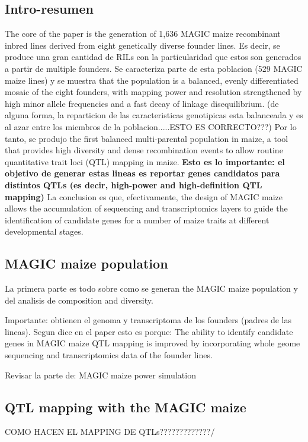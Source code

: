 \documentclass[a4paper,10pt]{article}
\begin{document}
\subsection{Intro-resumen}
The core of the paper is the generation of 1,636 MAGIC maize recombinant inbred lines derived from eight genetically diverse founder lines.
Es decir, se produce una gran cantidad de RILs con la particularidad que estos son generados a partir de multiple founders. 
Se caracteriza parte de esta poblacion (529 MAGIC maize lines) y se muestra that the population is a balanced, evenly differentiated mosaic of the eight founders, with mapping power and resolution strengthened by high minor allele frequencies and a fast decay of linkage disequilibrium.
(de alguna forma, la reparticion de las caracteristicas genotipicas esta balanceada y es al azar entre los miembros de la poblacion.....ESTO ES CORRECTO???)
Por lo tanto, se produjo the first balanced multi-parental population in maize, a tool that provides high diversity and dense recombination events to allow routine quantitative trait loci (QTL) mapping in maize.
\textbf{Esto es lo importante: el objetivo de generar estas lineas es reportar genes candidatos para distintos QTLs (es decir, high-power and high-definition QTL mapping)}
La conclusion es que, efectivamente, the design of MAGIC maize allows the accumulation of sequencing and transcriptomics layers to guide the identification of candidate genes for a number of maize traits at different developmental stages.


\subsection{MAGIC maize population}

La primera parte es todo sobre como se generan the MAGIC maize population y del analisis de composition and diversity.

Importante: obtienen el genoma y transcriptoma de los founders (padres de las lineas). Segun dice en el paper esto es porque: 
The ability to identify candidate genes in MAGIC maize QTL mapping is improved by incorporating whole geome sequencing and transcriptomics data of the founder lines.

Revisar la parte de: MAGIC maize power simulation

\subsection{QTL mapping with the MAGIC maize}
COMO HACEN EL MAPPING DE QTLs?????????????/
\end{document}
